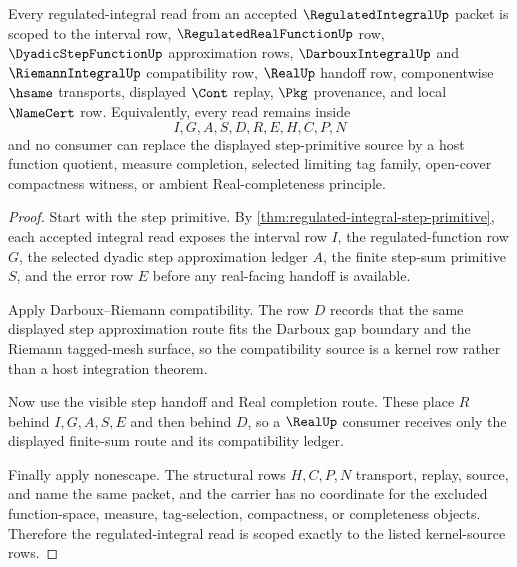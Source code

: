 \begin{theorem}
\label{thm:regulated-integral-kernel-source-scope}
Every regulated-integral read from an accepted $\RegulatedIntegralUp$ packet is scoped to the interval row, $\RegulatedRealFunctionUp$ row, $\DyadicStepFunctionUp$ approximation rows, $\DarbouxIntegralUp$ and $\RiemannIntegralUp$ compatibility row, $\RealUp$ handoff row, componentwise $\hsame$ transports, displayed $\Cont$ replay, $\Pkg$ provenance, and local $\NameCert$ row. Equivalently, every read remains inside
$$
I,G,A,S,D,R,E,H,C,P,N
$$
and no consumer can replace the displayed step-primitive source by a host function quotient, measure completion, selected limiting tag family, open-cover compactness witness, or ambient Real-completeness principle.
\end{theorem}
\begin{proof}
Start with the step primitive. By \autoref{thm:regulated-integral-step-primitive}, each accepted integral read exposes the interval row $I$, the regulated-function row $G$, the selected dyadic step approximation ledger $A$, the finite step-sum primitive $S$, and the error row $E$ before any real-facing handoff is available.

Apply Darboux--Riemann compatibility. The row $D$ records that the same displayed step approximation route fits the Darboux gap boundary and the Riemann tagged-mesh surface, so the compatibility source is a kernel row rather than a host integration theorem.

Now use the visible step handoff and Real completion route. These place $R$ behind $I,G,A,S,E$ and then behind $D$, so a $\RealUp$ consumer receives only the displayed finite-sum route and its compatibility ledger.

Finally apply nonescape. The structural rows $H,C,P,N$ transport, replay, source, and name the same packet, and the carrier has no coordinate for the excluded function-space, measure, tag-selection, compactness, or completeness objects. Therefore the regulated-integral read is scoped exactly to the listed kernel-source rows.
\end{proof}

